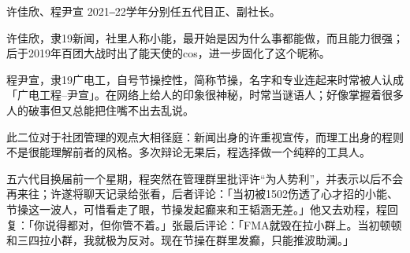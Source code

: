 \begin{section}{许佳欣、程尹宣}
	\label{person:许佳欣、程尹宣}
	2021‒22学年分别任五代目正、副社长。

	许佳欣，隶19新闻，社里人称小能，最开始是因为什么事都能做，而且能力很强；后于2019年百团大战时出了能天使的cos，进一步固化了这个昵称。

	程尹宣，隶19广电工，自号节操控性，简称节操，名字和专业连起来时常被人认成「广电工程--尹宣」。在网络上给人的印象很神秘，时常当谜语人；好像掌握着很多人的破事但又总能把住嘴不出去乱说。

	此二位对于社团管理的观点大相径庭：新闻出身的许重视宣传，而理工出身的程则不是很能理解前者的风格。多次辩论无果后，程选择做一个纯粹的工具人。

	五六代目换届前一个星期，程突然在管理群里批评许“为人势利”，并表示以后不会再来往；许遂将聊天记录给张看，后者评论：「当初被1502伤透了心才招的小能、节操这一波人，可惜看走了眼，节操发起癫来和王韬涵无差。」他又去劝程，程回复：「你说得都对，但你管不着。」张最后评论：「FMA就毁在拉小群上。当初顿顿和三四拉小群，我就极为反对。现在节操在群里发癫，只能推波助澜。」
\end{section}